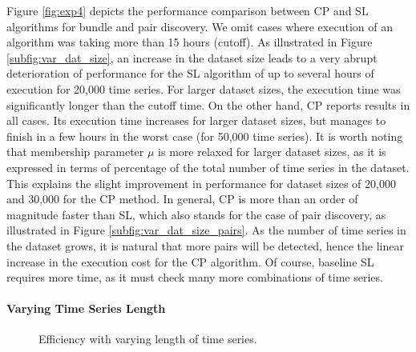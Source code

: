 Figure \ref{fig:exp4} depicts the performance comparison between CP and SL algorithms for bundle and pair discovery. We omit cases where execution of an algorithm was taking more than 15 hours (cutoff). As illustrated in Figure \ref{subfig:var_dat_size}, an increase in the dataset size leads to a very abrupt deterioration of performance for the SL algorithm of up to several hours of execution for 20,000 time series. For larger dataset sizes, the execution time was significantly longer than the cutoff time. On the other hand, CP reports results in all cases. Its execution time increases for larger dataset sizes, but manages to finish in a few hours in the worst case (for 50,000 time series). It is worth noting that membership parameter $\mu$ is more relaxed for larger dataset sizes, as it is expressed in terms of percentage of the total number of time series in the dataset. This explains the slight improvement in performance  for dataset sizes of 20,000 and 30,000 for the CP method. In general, CP is more than an order of magnitude faster than SL, which also stands for the case of pair discovery, as illustrated in Figure \ref{subfig:var_dat_size_pairs}. As the number of time series in the dataset grows, it is natural that more pairs will be detected, hence the linear increase in the execution cost for the CP algorithm. Of course, baseline SL requires more time, as it must check many more combinations of time series.

\paragraph{Varying Time Series Length}
\begin{figure}[!ht]
 \centering
 \caption{Efficiency with varying length of time series.}
 \label{fig:exp5}
\end{figure}

